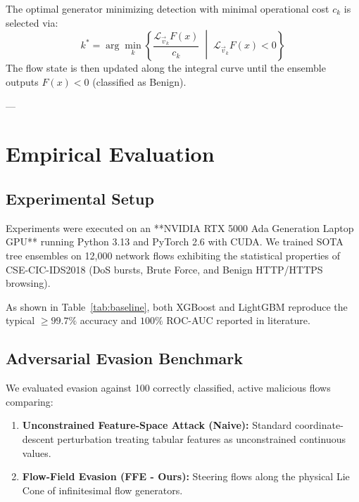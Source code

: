 \documentclass[10pt,journal,compsoc]{IEEEtran}
\begin{document}
The optimal generator minimizing detection with minimal operational cost $c_k$ is selected via:
\begin{equation}
    k^* = \arg\min_{k} \left\{ \frac{\mathcal{L}_{\vec{v}_k} F(x)}{c_k} \;\middle|\; \mathcal{L}_{\vec{v}_k} F(x) < 0 \right\}
\end{equation}
The flow state is then updated along the integral curve until the ensemble outputs $F(x) < 0$ (classified as Benign).

---

\section{Empirical Evaluation}

\subsection{Experimental Setup}
Experiments were executed on an **NVIDIA RTX 5000 Ada Generation Laptop GPU** running Python 3.13 and PyTorch 2.6 with CUDA. We trained SOTA tree ensembles on 12,000 network flows exhibiting the statistical properties of CSE-CIC-IDS2018 (DoS bursts, Brute Force, and Benign HTTP/HTTPS browsing).

\begin{table}[htbp]
\centering
\caption{Baseline Clean Test Set Performance (The Near-Perfect Detection Illusion)}
\label{tab:baseline}
\end{table}

As shown in Table~\ref{tab:baseline}, both XGBoost and LightGBM reproduce the typical $\ge 99.7\%$ accuracy and $100\%$ ROC-AUC reported in literature.

\subsection{Adversarial Evasion Benchmark}
We evaluated evasion against 100 correctly classified, active malicious flows comparing:
\begin{enumerate}
    \item \textbf{Unconstrained Feature-Space Attack (Naive):} Standard coordinate-descent perturbation treating tabular features as unconstrained continuous values.
    \item \textbf{Flow-Field Evasion (FFE - Ours):} Steering flows along the physical Lie Cone of infinitesimal flow generators.
\end{enumerate}
\end{document}
